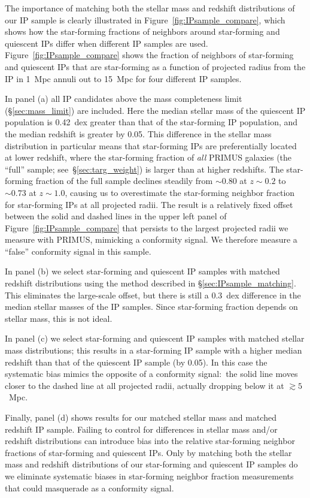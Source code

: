 The importance of matching both the stellar mass and redshift distributions of our 
IP sample is clearly illustrated in Figure~\ref{fig:IPsample_compare}, which shows 
how the star-forming fractions of neighbors around star-forming and quiescent IPs 
differ when different IP samples are used.
Figure~\ref{fig:IPsample_compare} shows the fraction of neighbors of star-forming 
and quiescent IPs that are star-forming as a function of projected radius from the 
IP in 1~Mpc annuli out to 15~Mpc for four different IP samples.
%

In panel (a) all IP candidates above the \citet{Moustakas13} mass completeness limit 
(\S\ref{sec:mass_limit}) are included.
Here the median stellar mass of the quiescent IP population is 0.42~dex greater 
than that of the star-forming IP population, and the median redshift is greater 
by 0.05.
This difference in the stellar mass distribution in particular means that 
star-forming IPs are preferentially located at lower redshift, where the star-forming fraction of \emph{all} PRIMUS galaxies (the ``full'' sample; see~\S\ref{sec:targ_weight}) is larger than at higher redshifts.  The star-forming fraction of the full sample declines steadily from $\sim0.80$ at $z\sim0.2$ to $\sim0.73$ at $z\sim1.0$, causing us to overestimate the star-forming neighbor fraction for star-forming IPs at all projected radii.
The result is a relatively fixed offset between the solid and dashed lines in the 
upper left panel of Figure~\ref{fig:IPsample_compare} that persists to the largest 
projected radii we measure with PRIMUS, mimicking a conformity signal.  We therefore
measure a ``false'' conformity signal in this sample.

In panel (b) we select star-forming and quiescent IP samples with matched redshift 
distributions using the method described in \S\ref{sec:IPsample_matching}.  This 
eliminates the large-scale offset, but there is still a 0.3~dex difference in the 
median stellar masses of the IP samples.
Since star-forming fraction depends on stellar mass, this is not ideal. 

In panel (c) we select star-forming and quiescent IP samples with matched stellar mass distributions; this results in a star-forming IP sample with a higher median 
redshift than that of the quiescent IP sample (by 0.05).
In this case the systematic bias mimics the opposite of a conformity signal:~the solid line moves closer to the dashed line at all projected radii, actually dropping below it at $\gtrsim5$~Mpc.

Finally, panel (d) shows results for our matched stellar mass and matched redshift IP sample.
Failing to control for differences in stellar mass and/or redshift distributions 
can introduce bias into the relative star-forming neighbor fractions of star-forming and quiescent IPs.
Only by matching both the stellar mass and redshift distributions of our star-forming and quiescent IP samples do we eliminate systematic biases in star-forming neighbor fraction measurements that could masquerade as a conformity signal.

